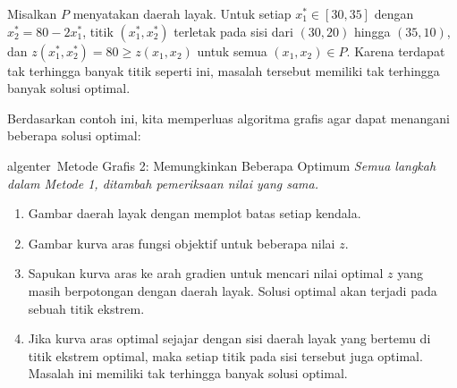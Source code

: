 \begin{solution}
Misalkan $P$ menyatakan daerah layak. Untuk setiap $x_1^* \in [30,35]$ dengan $x_2^* = 80 - 2x_1^*$, titik $(x_1^*,x_2^*)$ terletak pada sisi dari $(30,20)$ hingga $(35,10)$, dan $z(x_1^*,x_2^*) = 80 \geq z(x_1,x_2)$ untuk semua $(x_1,x_2)\in P$. Karena terdapat tak terhingga banyak titik seperti ini, masalah tersebut memiliki tak terhingga banyak solusi optimal.
\label{ex:FurnitureWorkshopAltOptSoln}
\end{solution}

Berdasarkan contoh ini, kita memperluas algoritma grafis agar dapat menangani beberapa solusi optimal:
\begin{stepbox}{algenter}{\ Metode Grafis 2: Memungkinkan Beberapa Optimum}
\emph{Semua langkah dalam Metode 1, ditambah pemeriksaan nilai yang sama.}
\begin{enumerate}[nosep]
\item Gambar daerah layak dengan memplot batas setiap kendala.
\item Gambar kurva aras fungsi objektif untuk beberapa nilai $z$.
\item Sapukan kurva aras ke arah gradien untuk mencari nilai optimal $z$ yang masih berpotongan dengan daerah layak. Solusi optimal akan terjadi pada sebuah titik ekstrem.
\item Jika kurva aras optimal sejajar dengan sisi daerah layak yang bertemu di titik ekstrem optimal, maka setiap titik pada sisi tersebut juga optimal. Masalah ini memiliki tak terhingga banyak solusi optimal.
\end{enumerate}
\end{stepbox}

